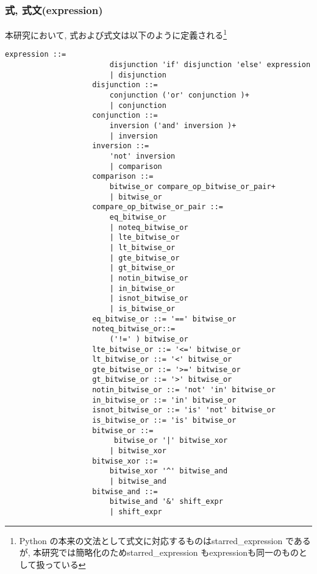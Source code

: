 \documentclass{jlreq}
\begin{document}
            \subsubsection{式, 式文(expression)}
                本研究において, 式および式文は以下のように定義される\footnote{Python の本来の文法として式文に対応するものはstarred\_expression であるが, 本研究では簡略化のためstarred\_expression もexpressionも同一のものとして扱っている}
                \begin{lstlisting}[caption=式の定義]
                    expression ::= 
                        disjunction 'if' disjunction 'else' expression 
                        | disjunction
                    disjunction ::=
                        conjunction ('or' conjunction )+ 
                        | conjunction
                    conjunction ::=
                        inversion ('and' inversion )+ 
                        | inversion
                    inversion ::=
                        'not' inversion 
                        | comparison
                    comparison ::=
                        bitwise_or compare_op_bitwise_or_pair+ 
                        | bitwise_or
                    compare_op_bitwise_or_pair ::=
                        eq_bitwise_or
                        | noteq_bitwise_or
                        | lte_bitwise_or
                        | lt_bitwise_or
                        | gte_bitwise_or
                        | gt_bitwise_or
                        | notin_bitwise_or
                        | in_bitwise_or
                        | isnot_bitwise_or
                        | is_bitwise_or
                    eq_bitwise_or ::= '==' bitwise_or 
                    noteq_bitwise_or::=
                        ('!=' ) bitwise_or 
                    lte_bitwise_or ::= '<=' bitwise_or 
                    lt_bitwise_or ::= '<' bitwise_or 
                    gte_bitwise_or ::= '>=' bitwise_or 
                    gt_bitwise_or ::= '>' bitwise_or 
                    notin_bitwise_or ::= 'not' 'in' bitwise_or 
                    in_bitwise_or ::= 'in' bitwise_or 
                    isnot_bitwise_or ::= 'is' 'not' bitwise_or 
                    is_bitwise_or ::= 'is' bitwise_or
                    bitwise_or ::=
                         bitwise_or '|' bitwise_xor 
                        | bitwise_xor
                    bitwise_xor ::=
                        bitwise_xor '^' bitwise_and 
                        | bitwise_and
                    bitwise_and ::=
                        bitwise_and '&' shift_expr 
                        | shift_expr

\end{lstlisting}
\end{document}
